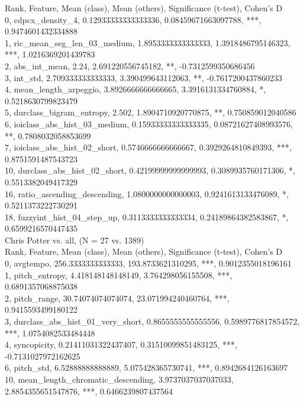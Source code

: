Rank, Feature, Mean (class), Mean (others), Significance (t-test), Cohen's D\\
0, cdpcx_density_4, 0.12933333333333336, 0.08459671663097788, ***, 0.9474601432334888\\
1, ric_mean_seg_len_03_medium, 1.8953333333333333, 1.3918486795146323, ***, 1.0216369201439783\\
2, abs_int_mean, 2.24, 2.691220556745182, **, -0.7312599350686456\\
3, int_std, 2.709333333333333, 3.390499643112063, **, -0.7617200437860233\\
4, mean_length_arpeggio, 3.8926666666666665, 3.3916131334760884, *, 0.5218630799823479\\
5, durclass_bigram_entropy, 2.502, 1.8904710920770875, **, 0.750859012040586\\
6, ioiclass_abs_hist_03_medium, 0.15933333333333335, 0.08721627408993576, **, 0.7808032058853699\\
7, ioiclass_abs_hist_02_short, 0.5746666666666667, 0.3929264810849393, ***, 0.8751591487543723\\
10, durclass_abs_hist_02_short, 0.42199999999999993, 0.3089935760171306, *, 0.5513382049417329\\
16, ratio_ascending_descending, 1.0800000000000003, 0.9241613133476089, *, 0.5211373222730291\\
18, fuzzyint_hist_04_step_up, 0.3113333333333334, 0.24189864382583867, *, 0.6599216570447435\\
Chris Potter vs. all, (N = 27 vs. 1389)\\
Rank, Feature, Mean (class), Mean (others), Significance (t-test), Cohen's D\\
0, avgtempo, 256.3333333333333, 193.8733621310295, ***, 0.9012355018196161\\
1, pitch_entropy, 4.418148148148149, 3.764298056155508, ***, 0.6891357068875038\\
2, pitch_range, 30.74074074074074, 23.071994240460764, ***, 0.9415593499180122\\
3, durclass_abs_hist_01_very_short, 0.8655555555555556, 0.5989776817854572, ***, 1.0754082533484448\\
4, syncopicity, 0.21411031322437407, 0.31510099851483125, ***, -0.7131027972162625\\
6, pitch_std, 6.52888888888889, 5.075428365730741, ***, 0.8942684126163697\\
10, mean_length_chromatic_descending, 3.9737037037037033, 2.8854355651547876, ***, 0.6466239807437564\\
